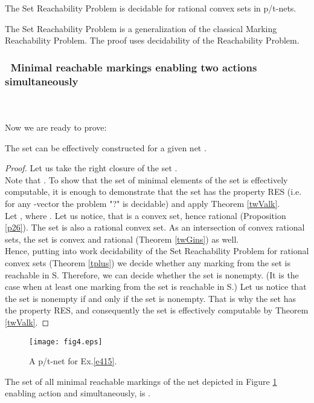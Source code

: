 \documentclass[a4paper]{llncs}
\begin{document}
\begin{theorem}
\label{tplus}
The Set Reachability Problem is decidable for rational convex sets in p/t-nets.
\end{theorem}
The Set Reachability Problem is a generalization of the classical Marking Reachability Problem. The proof uses decidability of the Reachability Problem.
\subsubsection{\textbullet \ Minimal reachable markings enabling two actions simultaneously}\mbox{ }\\ 
\\
Now we are ready to prove:

\begin{proposition}
\label {p414}
The set  can be effectively constructed for a given net  .
\end{proposition}

\begin{proof}
Let us take the right closure  of the set .
\\Note that . To show that the set of minimal elements of the set  is effectively computable, it is enough to demonstrate that the set   has the property RES (i.e. for any  -vector  the problem "?" is decidable) and apply Theorem \ref{twValk}. \\
Let , where . Let us notice, that   is a convex set, hence rational (Proposition \ref{p26}). The set  is also a rational convex set. As an intersection of convex rational sets, the set  is convex and rational (Theorem \ref{twGins}) as well.\\
Hence, putting into work decidability of the Set Reachability Problem for rational convex sets (Theorem \ref{tplus}) we decide whether any marking from the set  is reachable in S. Therefore, we can decide whether the set  is nonempty. (It is the case when at least one marking from the set  is reachable in S.) Let us notice that the set   is nonempty if and only if the set  is nonempty. That is why the set   has the property RES, and consequently the set  is effectively computable by Theorem \ref{twValk}. 	
\end{proof}

\begin{example}
\label{e415}

\begin{figure}[h]
\centering
\texttt{[image: fig4.eps]}
\caption{A p/t-net for Ex.\ref{e415}.}
\label{Fig4}
\end{figure}


The set of all minimal reachable markings of the net depicted in Figure \ref{Fig4} enabling action  and  simultaneously, is .
\end{example}
\end{document}
